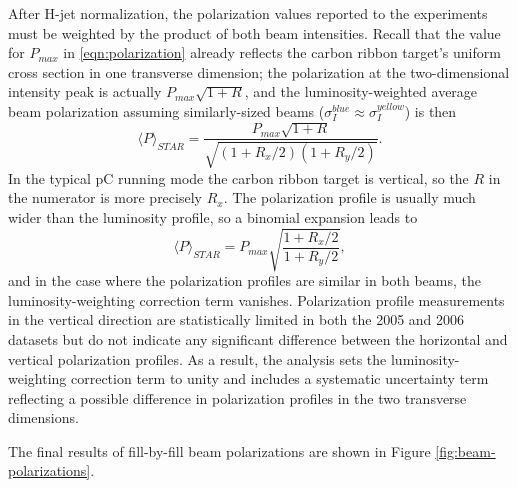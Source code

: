 After H-jet normalization, the polarization values reported to the experiments
must be weighted by the product of both beam intensities. Recall that the
value for \(P_{max}\) in \ref{eqn:polarization} already reflects the carbon
ribbon target's uniform cross section in one transverse dimension; the
polarization at the two-dimensional intensity peak is actually
\(P_{max}\sqrt{1+R}\), and the luminosity-weighted average beam polarization
assuming similarly-sized beams (\(\sigma_I^{blue} \approx \sigma_I^{yellow}\))
is then
%
\begin{equation}
  \langle P \rangle_{STAR} = \frac{P_{max} \sqrt{1+R}}{\sqrt{(1+R_x/2)(1+R_y/2)}}.
\end{equation}
%
In the typical pC running mode the carbon ribbon target is vertical, so the
\(R\) in the numerator is more precisely \(R_x\). The polarization profile is
usually much wider than the luminosity profile, so a binomial expansion leads
to
%
\begin{equation}
  \langle P \rangle_{STAR} = P_{max} \sqrt{\frac{1+R_x/2}{1+R_y/2}},
\end{equation}
and in the case where the polarization profiles are similar in both beams, the
luminosity-weighting correction term vanishes. Polarization profile
measurements in the vertical direction are statistically limited in both the
2005 and 2006 datasets but do not indicate any significant difference between
the horizontal and vertical polarization profiles. As a result, the analysis
sets the luminosity-weighting correction term to unity and includes a
systematic uncertainty term reflecting a possible difference in polarization
profiles in the two transverse dimensions.

The final results of fill-by-fill beam polarizations are shown in Figure
\ref{fig:beam-polarizations}. %




